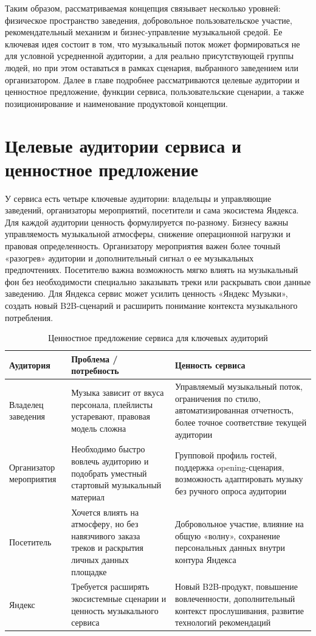 Таким образом, рассматриваемая концепция связывает несколько уровней: физическое пространство заведения, добровольное пользовательское участие, рекомендательный механизм и бизнес-управление музыкальной средой. Ее ключевая идея состоит в том, что музыкальный поток может формироваться не для условной усредненной аудитории, а для реально присутствующей группы людей, но при этом оставаться в рамках сценария, выбранного заведением или организатором. Далее в главе подробнее рассматриваются целевые аудитории и ценностное предложение, функции сервиса, пользовательские сценарии, а также позиционирование и наименование продуктовой концепции.

\section{Целевые аудитории сервиса и ценностное предложение}
\label{sec:service:audiences}

У сервиса есть четыре ключевые аудитории: владельцы и управляющие заведений, организаторы мероприятий, посетители и сама экосистема Яндекса. Для каждой аудитории ценность формулируется по-разному. Бизнесу важны управляемость музыкальной атмосферы, снижение операционной нагрузки и правовая определенность. Организатору мероприятия важен более точный «разогрев» аудитории и дополнительный сигнал о ее музыкальных предпочтениях. Посетителю важна возможность мягко влиять на музыкальный фон без необходимости специально заказывать треки или раскрывать свои данные заведению. Для Яндекса сервис может усилить ценность «Яндекс Музыки», создать новый B2B-сценарий и расширить понимание контекста музыкального потребления.

\begin{table}[htbp]
\caption{Ценностное предложение сервиса для ключевых аудиторий}
\label{tab:value-proposition}
\centering
\small
\singlespacing
\begin{tabularx}{\textwidth}{p{}X X}
\toprule
Аудитория & Проблема / потребность & Ценность сервиса \\
\midrule
Владелец заведения & Музыка зависит от вкуса персонала, плейлисты устаревают, правовая модель сложна & Управляемый музыкальный поток, ограничения по стилю, автоматизированная отчетность, более точное соответствие текущей аудитории \\
\addlinespace
Организатор мероприятия & Необходимо быстро вовлечь аудиторию и подобрать уместный стартовый музыкальный материал & Групповой профиль гостей, поддержка opening-сценария, возможность адаптировать музыку без ручного опроса аудитории \\
\addlinespace
Посетитель & Хочется влиять на атмосферу, но без навязчивого заказа треков и раскрытия личных данных площадке & Добровольное участие, влияние на общую «волну», сохранение персональных данных внутри контура Яндекса \\
\addlinespace
Яндекс & Требуется расширять экосистемные сценарии и ценность музыкального сервиса & Новый B2B-продукт, повышение вовлеченности, дополнительный контекст прослушивания, развитие технологий рекомендаций \\
\bottomrule
\end{tabularx}
\end{table}

